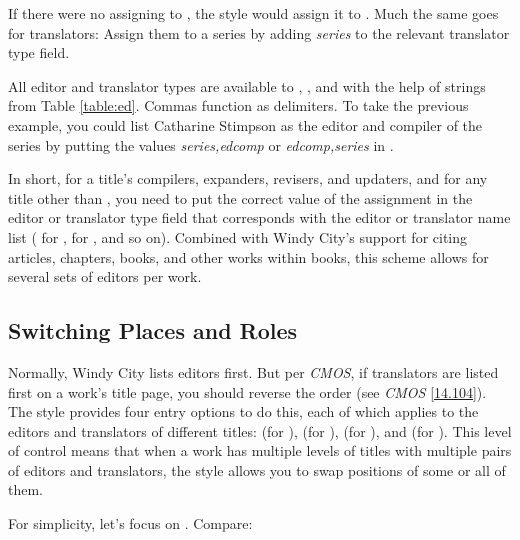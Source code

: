 \documentclass[11pt,letterpaper,oneside]{article}
\begin{document}
\begin{citebib}
\item \cite{allen2009}
\end{citebib}

\noindent If there were no  assigning
 to , the style would assign it to
. Much the same goes for translators: Assign them to a
series by adding \textit{series} to the relevant translator type
field.

All editor and translator types are available to
, , and 
with the help of strings from Table \ref{table:ed}. Commas function as
delimiters. To take the previous example, you could list Catharine
Stimpson as the editor and compiler of the series by putting the
values \textit{series,edcomp} or \textit{edcomp,series} in
.

In short, for a title's compilers, expanders, revisers, and updaters,
and for any title other than , you need to put the
correct value of the assignment in the editor or translator type field
that corresponds with the editor or translator name list
( for ,
 for , and so on).
Combined with Windy City's support for citing articles, chapters,
books, and other works within books, this scheme allows for several
sets of editors per work.

\subsection{Switching Places and Roles} \label{edtranspos}

Normally, Windy City lists editors first. But per \textit{CMOS}, if
translators are listed first on a work's title page, you should
reverse the order (see \textit{CMOS} \ref{14.104}). The style provides
four entry options to do this, each of which applies to the editors
and translators of different titles:  (for
),  (for ),
 (for ), and
 (for ). This level of control
means that when a work has multiple levels of titles with multiple
pairs of editors and translators, the style allows you to swap
positions of some or all of them.

For simplicity, let's focus on . Compare:
\end{document}
